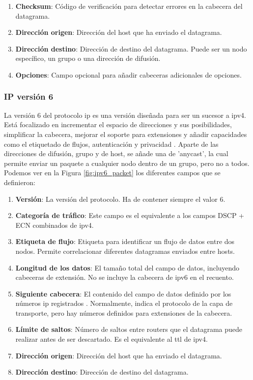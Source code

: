 \begin{enumerate}
    \item \textbf{Checksum}: Código de verificación para detectar errores en la cabecera del datagrama.
    \item \textbf{Dirección origen}: Dirección del host que ha enviado el datagrama.
    \item \textbf{Dirección destino}: Dirección de destino del datagrama. Puede ser un nodo específico, un grupo o una dirección de difusión.
    \item \textbf{Opciones}: Campo opcional para añadir cabeceras adicionales de opciones.
\end{enumerate}

\subsubsection{IP versión 6} \label{ipv6format}

La versión 6 del protocolo \acrshort{ip} es una versión diseñada para ser un sucesor a \acrshort{ipv4}. Está focalizado en incrementar el espacio de direcciones y sus posibilidades, simplificar la cabecera, mejorar el soporte para extensiones y añadir capacidades como el etiquetado de flujos, autenticación y privacidad \cite{rfc8200}. Aparte de las direcciones de difusión, grupo y de host, se añade una de 'anycast', la cual permite enviar un paquete a cualquier nodo dentro de un grupo, pero no a todos. Podemos ver en la Figura \ref{fig:ipv6_packet} los diferentes campos que se definieron:

\begin{enumerate}
    \item \textbf{Versión}: La versión del protocolo. Ha de contener siempre el valor 6.
    \item \textbf{Categoría de tráfico}: Este campo es el equivalente a los campos DSCP + ECN combinados de \acrshort{ipv4}.
    \item \textbf{Etiqueta de flujo}: Etiqueta para identificar un flujo de datos entre dos nodos. Permite correlacionar diferentes datagramas enviados entre hosts.
    \item \textbf{Longitud de los datos}: El tamaño total del campo de datos, incluyendo cabeceras de extensión. No se incluye la cabecera de \acrshort{ipv6} en el recuento.
    \item \textbf{Siguiente cabecera}: El contenido del campo de datos definido por los números \acrshort{ip} registrados \cite{ipprotocolnumbers}. Normalmente, indica el protocolo de la capa de transporte, pero hay números definidos para extensiones de la cabecera.
    \item \textbf{Límite de saltos}: Número de saltos entre routers que el datagrama puede realizar antes de ser descartado. Es el equivalente al \acrshort{ttl} de \acrshort{ipv4}.
    \item \textbf{Dirección origen}: Dirección del host que ha enviado el datagrama.
    \item \textbf{Dirección destino}: Dirección de destino del datagrama.
\end{enumerate}


